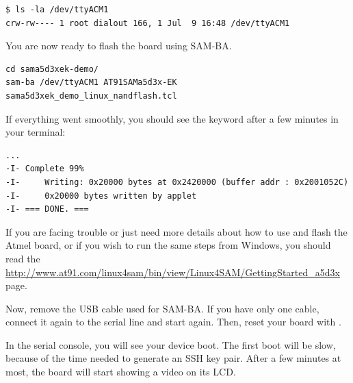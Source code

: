 \begin{verbatim}
$ ls -la /dev/ttyACM1 
crw-rw---- 1 root dialout 166, 1 Jul  9 16:48 /dev/ttyACM1
\end{verbatim}

You are now ready to flash the board using SAM-BA.

\begin{verbatim}
cd sama5d3xek-demo/
sam-ba /dev/ttyACM1 AT91SAMa5d3x-EK sama5d3xek_demo_linux_nandflash.tcl
\end{verbatim}

If everything went smoothly, you should see the  keyword
after a few minutes in your terminal:

\begin{verbatim}
...
-I- Complete 99%
-I- 	Writing: 0x20000 bytes at 0x2420000 (buffer addr : 0x2001052C)
-I- 	0x20000 bytes written by applet
-I- === DONE. ===
\end{verbatim}

If you are facing trouble or just need more details about how to use and
flash the Atmel board, or if you wish to run the same steps from
Windows, you should read the
\url{http://www.at91.com/linux4sam/bin/view/Linux4SAM/GettingStarted_a5d3x}
page. 

Now, remove the USB cable used for SAM-BA. If you have only one cable,
connect it again to the serial line and start  again.
Then, reset your board with . 

In the serial console, you will see your device boot. The first boot
will be slow, because of the time needed to generate an SSH key pair. 
After a few minutes at most, the board will start showing a video on
its LCD. 

